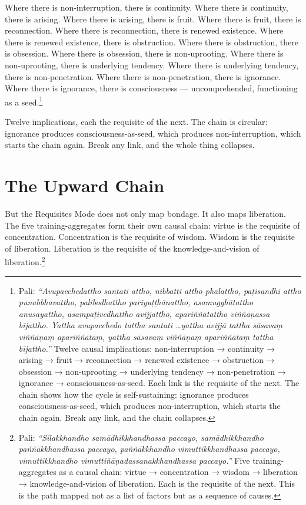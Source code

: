 Where there is non-interruption, there is continuity. Where there is continuity, there is arising. Where there is arising, there is fruit. Where there is fruit, there is reconnection. Where there is reconnection, there is renewed existence. Where there is renewed existence, there is obstruction. Where there is obstruction, there is obsession. Where there is obsession, there is non-uprooting. Where there is non-uprooting, there is underlying tendency. Where there is underlying tendency, there is non-penetration. Where there is non-penetration, there is ignorance. Where there is ignorance, there is consciousness --- uncomprehended, functioning as a seed.\footnote{Pali: \textit{``Avupacchedattho santati attho, nibbatti attho phalattho, paṭisandhi attho punabbhavattho, palibodhattho pariyuṭṭhānattho, asamugghātattho anusayattho, asampaṭivedhattho avijjattho, apariññātattho viññāṇassa bījattho. Yattha avupacchedo tattha santati \ldots yattha avijjā tattha sāsavaṃ viññāṇaṃ apariññātaṃ, yattha sāsavaṃ viññāṇaṃ apariññātaṃ tattha bījattho.''} Twelve causal implications: non-interruption → continuity → arising → fruit → reconnection → renewed existence → obstruction → obsession → non-uprooting → underlying tendency → non-penetration → ignorance → consciousness-as-seed. Each link is the requisite of the next. The chain shows how the cycle is self-sustaining: ignorance produces consciousness-as-seed, which produces non-interruption, which starts the chain again. Break any link, and the chain collapses.}

Twelve implications, each the requisite of the next. The chain is circular: ignorance produces consciousness-as-seed, which produces non-interruption, which starts the chain again. Break any link, and the whole thing collapses.

\section*{The Upward Chain}

But the Requisites Mode does not only map bondage. It also maps liberation. The five training-aggregates form their own causal chain: virtue is the requisite of concentration. Concentration is the requisite of wisdom. Wisdom is the requisite of liberation. Liberation is the requisite of the knowledge-and-vision of liberation.\footnote{Pali: \textit{``Sīlakkhandho samādhikkhandhassa paccayo, samādhikkhandho paññākkhandhassa paccayo, paññākkhandho vimuttikkhandhassa paccayo, vimuttikkhandho vimuttiñāṇadassanakkhandhassa paccayo.''} Five training-aggregates as a causal chain: virtue → concentration → wisdom → liberation → knowledge-and-vision of liberation. Each is the requisite of the next. This is the path mapped not as a list of factors but as a sequence of causes.}


